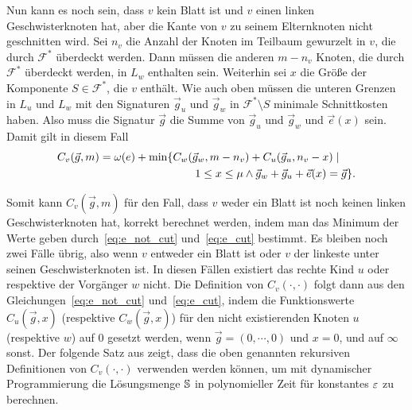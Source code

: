 Nun kann es noch sein, dass $v$ kein Blatt ist und $v$ einen linken Geschwisterknoten hat, aber die Kante von $v$ zu seinem Elternknoten nicht geschnitten wird.
Sei $n_v$ die Anzahl der Knoten im Teilbaum gewurzelt in $v$, die durch $\mathcal{F}^*$ überdeckt werden.
Dann müssen die anderen $m - n_v$ Knoten, die durch $\mathcal{F}^*$ überdeckt werden, in $L_w$ enthalten sein.
Weiterhin sei $x$ die Größe der Komponente $S \in \mathcal{F}^*$, die $v$ enthält.
Wie auch oben müssen die unteren Grenzen in $L_u$ und $L_w$ mit den Signaturen $\vec{g}_u$ und $\vec{g}_w$ in $\mathcal{F}^* \setminus {S}$ minimale Schnittkosten haben.
Also muss die Signatur $\vec{g}$ die Summe von $\vec{g}_u$ und $\vec{g}_w$ und $\vec{e}(x)$ sein.
Damit gilt in diesem Fall
\begin{equation}\label{eq:e_cut}
    \begin{aligned}
        C_v(\vec{g}, m) = \omega(e) + \min \{ & C_w(\vec{g}_w, m - n_v) + C_u(\vec{g}_u, n_v - x) \mid \\ & \qquad 1 \leq x \leq \mu \land \vec{g}_w + \vec{g}_u + \vec{e}(x) = \vec{g} \}.
    \end{aligned}
\end{equation}

Somit kann $C_v(\vec{g}, m)$ für den Fall, dass $v$ weder ein Blatt ist noch keinen linken Geschwisterknoten hat, korrekt berechnet werden, indem man das Minimum der Werte geben durch~\eqref{eq:e_not_cut} und~\eqref{eq:e_cut} bestimmt.
Es bleiben noch zwei Fälle übrig, also wenn $v$ entweder ein Blatt ist oder $v$ der linkeste unter seinen Geschwisterknoten ist.
In diesen Fällen existiert das rechte Kind $u$ oder respektive der Vorgänger $w$ nicht.
Die Definition von $C_v(\cdot, \cdot)$ folgt dann aus den Gleichungen~\eqref{eq:e_not_cut} und~\eqref{eq:e_cut}, indem die Funktionswerte $C_u(\vec{g}, x)$ (respektive $C_w(\vec{g}, x)$) für den nicht existierenden Knoten $u$ (respektive $w$) auf $0$ gesetzt werden, wenn $\vec{g} = (0, \cdots, 0)$ und $x = 0$, und auf $\infty$ sonst. 
Der folgende Satz aus \parencite{FF15} zeigt, dass die oben genannten rekursiven Definitionen von $C_v(\cdot, \cdot)$ verwenden werden können, um mit dynamischer Programmierung die Lösungsmenge $\mathbb{S}$ in polynomieller Zeit für konstantes $\varepsilon$ zu berechnen.

